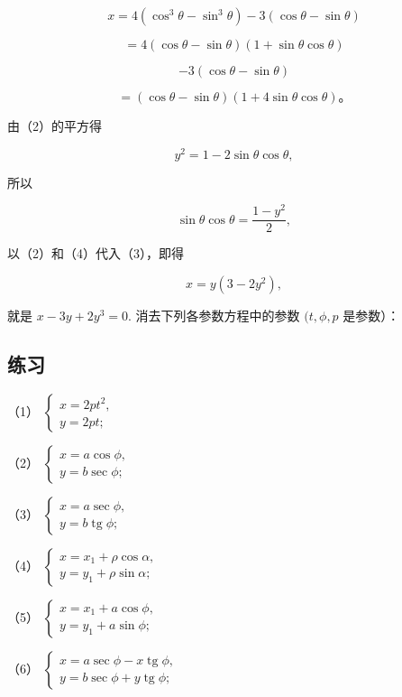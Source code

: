\[
x = 4 (\cos^{3} \theta - \sin^{3} \theta) - 3 (\cos \theta - \sin \theta)
\]

\[
= 4 (\cos \theta - \sin \theta) (1 + \sin \theta \cos \theta)
\]

\[
- 3 (\cos \theta - \sin \theta)
\]

\[
= (\cos \theta - \sin \theta) (1 + 4 \sin \theta \cos \theta)\text{。} \tag {3}
\]

由（2）的平方得

\[
y^{2} = 1 - 2 \sin \theta \cos \theta,
\]

所以

\[
\sin \theta \cos \theta = \frac {1 - y^{2}}{2}, \tag {4}
\]

以（2）和（4）代入（3），即得

\[
x = y (3 - 2 y^{2}),
\]

就是 \(x - 3y + 2y^3 = 0.\) 消去下列各参数方程中的参数 \((t, \phi, p\)
是参数）：

\subsection{练习}\label{ux7ec3ux4e60-18}

（1）
\(\left\{ \begin{array}{l} x = 2p t^2, \\ y = 2p t; \end{array} \right.\)

（2）
\(\left\{ \begin{array}{l} x = a \cos \phi, \\ y = b \sec \phi; \end{array} \right.\)

（3）
\(\left\{ \begin{array}{l} x = a \sec \phi, \\ y = b \operatorname{tg} \phi; \end{array} \right.\)

（4）
\(\left\{ \begin{array}{l} x = x_{1} + \rho \cos \alpha, \\ y = y_{1} + \rho \sin \alpha; \end{array} \right.\)

（5）
\(\left\{ \begin{array}{l} x = x_{1} + a \cos \phi, \\ y = y_{1} + a \sin \phi; \end{array} \right.\)

（6）
\(\left\{ \begin{array}{l} x = a \sec \phi - x \operatorname{tg} \phi, \\ y = b \sec \phi + y \operatorname{tg} \phi; \end{array} \right.\)

